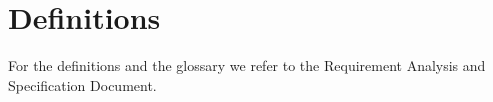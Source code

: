 \section{Definitions}
For the definitions and the glossary we refer to the Requirement Analysis and Specification Document.